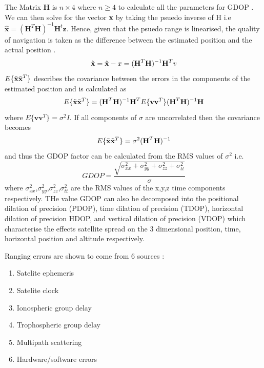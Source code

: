 The Matrix \textbf{H} is $n\times4$ where $n \geq 4$ to calculate all the parameters for GDOP \cite{jwo2001efficient}. We can then solve for the vector \textbf{x} by taking the psuedo inverse of H i.e $\hat{\textbf{x}} = (\textbf{H}^T\textbf{H})^{-1}\textbf{H}^t\textbf{z}$. Hence, given that the psuedo range is linearised, the quality of navigation is taken as the difference between the estimated position and the actual position \cite{jwo2001efficient}.
\begin{equation}
	\Tilde{\textbf{x}} = \hat{\textbf{x}} - x = (\textbf{H}^T\textbf{H})^{-1}\textbf{H}^Tv
\end{equation}
$E\{\Tilde{\textbf{x}}\Tilde{\textbf{x}}^T\}$ describes the covariance between the errors in the components of the estimated position \cite{jwo2001efficient} and is calculated as 
\begin{equation}
	E\{\Tilde{\textbf{x}}\Tilde{\textbf{x}}^T\} = (\textbf{H}^T\textbf{H})^{-1}\textbf{H}^TE\{\textbf{vv}^T\} (\textbf{H}^T\textbf{H})^{-1}\textbf{H}
\end{equation}
where $E\{\textbf{vv}^T\} = \sigma^2 I$. If all components of $\sigma$ are uncorrelated then the covariance becomes 
\begin{equation}
	E\{\Tilde{\textbf{x}}\Tilde{\textbf{x}}^T\} = \sigma^2(\textbf{H}^T\textbf{H})^{-1}
\end{equation}
and thus the GDOP factor can be calculated from the RMS values of $\sigma^2$ i.e.
\begin{equation}
	GDOP = \frac{\sqrt{\sigma_{xx}^2+\sigma_{yy}^2+ \sigma_{zz}^2+\sigma_{tt}^2}}{\sigma}
\end{equation} where $\sigma_{xx}^2$,$\sigma_{yy}^2$,$\sigma_{zz}^2$,$\sigma_{tt}^2$ are the RMS values of the x,y,z time components respectively. THe value GDOP can also be decomposed into the positional dilation of precision (PDOP), time dilation of precision (TDOP), horizontal dilation of precision HDOP, and vertical dilation of precision (VDOP) which characterise the effects satellite spread on the 3 dimensional position, time, horizontal position and altitude respectively.\par

Ranging errors are shown to come from 6 sources \cite{spilker1996global}:
\begin{enumerate}
	\item Satelite ephemeris
	\item Satelite clock
	\item Ionospheric group delay
	\item Trophospheric group delay
	\item Multipath scattering
	\item Hardware/software errors
\end{enumerate}

